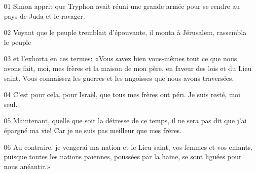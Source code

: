 01 Simon apprit que Tryphon avait réuni une grande armée pour se rendre au pays de Juda et le ravager.

02 Voyant que le peuple tremblait d’épouvante, il monta à Jérusalem, rassembla le peuple

03 et l’exhorta en ces termes: «Vous savez bien vous-mêmes tout ce que nous avons fait, moi, mes frères et la maison de mon père, en faveur des lois et du Lieu saint. Vous connaissez les guerres et les angoisses que nous avons traversées.

04 C’est pour cela, pour Israël, que tous mes frères ont péri. Je suis resté, moi seul.

05 Maintenant, quelle que soit la détresse de ce temps, il ne sera pas dit que j’ai épargné ma vie! Car je ne suis pas meilleur que mes frères.

06 Au contraire, je vengerai ma nation et le Lieu saint, vos femmes et vos enfants, puisque toutes les nations païennes, poussées par la haine, se sont liguées pour nous anéantir.»

